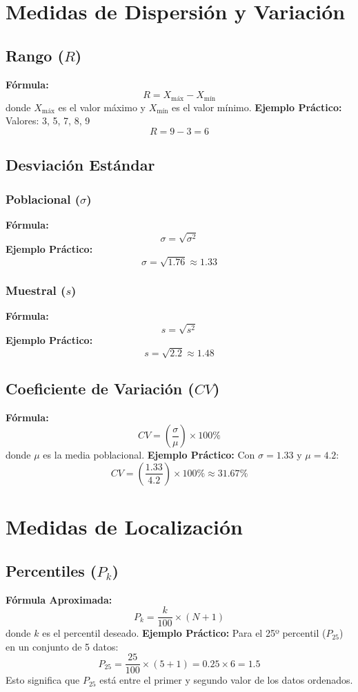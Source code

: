 \documentclass[10pt]{article}
\begin{document}
\begin{multicols}{2}
		\section*{Medidas de Dispersión y Variación}
		
		\subsection*{Rango ($R$)}
		\textbf{Fórmula:}
		\[
		R = X_{\text{máx}} - X_{\text{mín}}
		\]
		donde \( X_{\text{máx}} \) es el valor máximo y \( X_{\text{mín}} \) es el valor mínimo.
		\textbf{Ejemplo Práctico:}  
		Valores: 3, 5, 7, 8, 9  
		\[
		R = 9 - 3 = 6
		\]
		

		
		\subsection*{Desviación Estándar}
		
		\subsubsection*{Poblacional ($\sigma$)}
		\textbf{Fórmula:}
		\[
		\sigma = \sqrt{\sigma^2}
		\]
		\textbf{Ejemplo Práctico:}  
		\[
		\sigma = \sqrt{1.76} \approx 1.33
		\]
		
		\subsubsection*{Muestral ($s$)}
		\textbf{Fórmula:}
		\[
		s = \sqrt{s^2}
		\]
		\textbf{Ejemplo Práctico:}  
		\[
		s = \sqrt{2.2} \approx 1.48
		\]
		
		\subsection*{Coeficiente de Variación ($CV$)}
		\textbf{Fórmula:}
		\[
		CV = \left( \frac{\sigma}{\mu} \right) \times 100\%
		\]
		donde \( \mu \) es la media poblacional.
		\textbf{Ejemplo Práctico:}  
		Con \( \sigma = 1.33 \) y \( \mu = 4.2 \):
		\[
		CV = \left( \frac{1.33}{4.2} \right) \times 100\% \approx 31.67\%
		\]
		
		\section*{Medidas de Localización}
		
		\subsection*{Percentiles ($P_k$)}
		\textbf{Fórmula Aproximada:}
		\[
		P_k = \frac{k}{100} \times (N + 1)
		\]
		donde \( k \) es el percentil deseado.
		\textbf{Ejemplo Práctico:}  
		Para el 25º percentil (\( P_{25} \)) en un conjunto de 5 datos:
		\[
		P_{25} = \frac{25}{100} \times (5 + 1) = 0.25 \times 6 = 1.5
		\]
		Esto significa que \( P_{25} \) está entre el primer y segundo valor de los datos ordenados.
		

\end{multicols}
\end{document}
